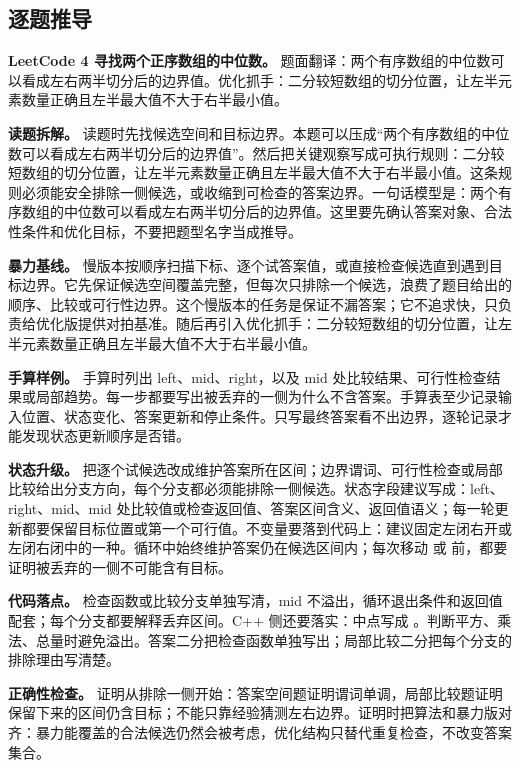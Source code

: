 \subsection{逐题推导}

\noindent\textbf{LeetCode 4 寻找两个正序数组的中位数。} 题面翻译：两个有序数组的中位数可以看成左右两半切分后的边界值。优化抓手：二分较短数组的切分位置，让左半元素数量正确且左半最大值不大于右半最小值。

\textbf{读题拆解。} 读题时先找候选空间和目标边界。本题可以压成“两个有序数组的中位数可以看成左右两半切分后的边界值”。然后把关键观察写成可执行规则：二分较短数组的切分位置，让左半元素数量正确且左半最大值不大于右半最小值。这条规则必须能安全排除一侧候选，或收缩到可检查的答案边界。一句话模型是：两个有序数组的中位数可以看成左右两半切分后的边界值。这里要先确认答案对象、合法性条件和优化目标，不要把题型名字当成推导。

\textbf{暴力基线。} 慢版本按顺序扫描下标、逐个试答案值，或直接检查候选直到遇到目标边界。它先保证候选空间覆盖完整，但每次只排除一个候选，浪费了题目给出的顺序、比较或可行性边界。这个慢版本的任务是保证不漏答案；它不追求快，只负责给优化版提供对拍基准。随后再引入优化抓手：二分较短数组的切分位置，让左半元素数量正确且左半最大值不大于右半最小值。

\textbf{手算样例。} 手算时列出 left、mid、right，以及 mid 处比较结果、可行性检查结果或局部趋势。每一步都要写出被丢弃的一侧为什么不含答案。手算表至少记录输入位置、状态变化、答案更新和停止条件。只写最终答案看不出边界，逐轮记录才能发现状态更新顺序是否错。

\textbf{状态升级。} 把逐个试候选改成维护答案所在区间；边界谓词、可行性检查或局部比较给出分支方向，每个分支都必须能排除一侧候选。状态字段建议写成：left、right、mid、mid 处比较值或检查返回值、答案区间含义、返回值语义；每一轮更新都要保留目标位置或第一个可行值。不变量要落到代码上：建议固定左闭右开或左闭右闭中的一种。循环中始终维护答案仍在候选区间内；每次移动  或  前，都要证明被丢弃的一侧不可能含有目标。

\textbf{代码落点。} 检查函数或比较分支单独写清，mid 不溢出，循环退出条件和返回值配套；每个分支都要解释丢弃区间。C++ 侧还要落实：中点写成 。判断平方、乘法、总量时避免溢出。答案二分把检查函数单独写出；局部比较二分把每个分支的排除理由写清楚。

\textbf{正确性检查。} 证明从排除一侧开始：答案空间题证明谓词单调，局部比较题证明保留下来的区间仍含目标；不能只靠经验猜测左右边界。证明时把算法和暴力版对齐：暴力能覆盖的合法候选仍然会被考虑，优化结构只替代重复检查，不改变答案集合。

